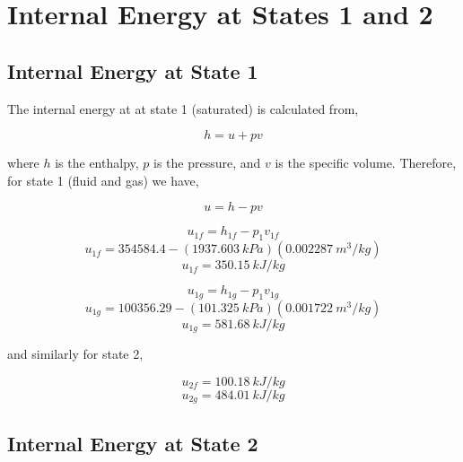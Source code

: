 \documentclass[10pt,parskip=half,
toc=sectionentrywithdots,
bibliography=totocnumbered,
captions=tableheading,numbers=noendperiod]{scrartcl}
\begin{document}
\hypertarget{internal-energy-at-states-1-and-2}{%
\section{Internal Energy at States 1 and
2}\label{internal-energy-at-states-1-and-2}}

\hypertarget{internal-energy-at-state-1}{%
\subsection{Internal Energy at State
1}\label{internal-energy-at-state-1}}

The internal energy at at state 1 (saturated) is calculated from,

\begin{equation}h = u + pv\end{equation}

where \(h\) is the enthalpy, \(p\) is the pressure, and \(v\) is the
specific volume. Therefore, for state 1 (fluid and gas) we have,

\begin{equation}u = h - pv\end{equation}

\begin{equation}u_{1f} = h_{1f} - p_1v_{1f}\end{equation}
\begin{equation}u_{1f} = 354584.4 - (1937.603\:kPa)(0.002287\:m^3/kg)\end{equation}
\begin{equation}u_{1f} = 350.15\:kJ/kg\end{equation}

\begin{equation}u_{1g} = h_{1g} - p_1v_{1g}\end{equation}
\begin{equation}u_{1g} = 100356.29 - (101.325\:kPa)(0.001722\:m^3/kg)\end{equation}
\begin{equation}u_{1g} = 581.68\:kJ/kg\end{equation}

and similarly for state 2,

\begin{equation}u_{2f} = 100.18\:kJ/kg\end{equation}
\begin{equation}u_{2g} = 484.01\:kJ/kg\end{equation}

\hypertarget{internal-energy-at-state-2}{%
\subsection{Internal Energy at State
2}\label{internal-energy-at-state-2}}
\end{document}
